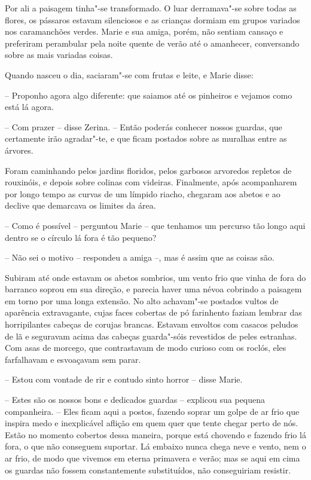 Por ali a paisagem tinha"-se transformado. O luar derramava"-se sobre
todas as flores, os pássaros estavam silenciosos e as crianças dormiam
em grupos variados nos caramanchões verdes. Marie e sua amiga, porém,
não sentiam cansaço e preferiram perambular pela noite quente  de verão
até o amanhecer, conversando sobre as mais variadas coisas. 

Quando nasceu o dia, saciaram"-se com frutas e leite, e Marie disse:

-- Proponho agora algo diferente: que saiamos até os pinheiros e
vejamos como está lá agora.

-- Com prazer -- disse Zerina. -- Então poderás conhecer nossos
guardas, que certamente irão agradar"-te, e que ficam postados sobre as
muralhas entre as árvores.

Foram caminhando pelos jardins floridos, pelos garbosos arvoredos repletos
de rouxinóis, e depois sobre colinas com videiras. Finalmente, após
acompanharem por longo tempo as curvas de um límpido riacho, chegaram
aos abetos e ao declive que demarcava os limites da área.

-- Como é possível -- perguntou Marie -- que tenhamos um percurso tão
longo aqui dentro se o círculo lá fora é tão pequeno?

-- Não sei o motivo -- respondeu a amiga --, mas é assim que as coisas são.

Subiram até onde estavam os abetos sombrios, um vento frio que vinha de
fora do barranco soprou em sua direção, e parecia haver uma névoa
cobrindo a paisagem em torno por uma longa extensão. No alto achavam"-se
postados vultos de aparência extravagante, cujas faces cobertas de pó
farinhento faziam lembrar das horripilantes cabeças de corujas brancas.
Estavam envoltos com casacos peludos de lã e seguravam acima das
cabeças guarda"-sóis revestidos de peles estranhas. Com asas de morcego,
que contrastavam de modo curioso com os roclós, eles farfalhavam e
esvoaçavam sem parar.

-- Estou com vontade de rir e contudo sinto horror -- disse Marie.

-- Estes são os nossos bons e dedicados guardas -- explicou sua
pequena companheira. -- Eles ficam aqui a postos, fazendo soprar um golpe
de ar frio que inspira medo e inexplicável aflição em quem quer que tente
chegar perto de nós. Estão no momento cobertos dessa maneira, porque
está chovendo e fazendo frio lá fora, o que não conseguem suportar. Lá
embaixo nunca chega neve e vento, nem o ar frio, de modo que vivemos em
eterna primavera e verão; mas se aqui em cima os guardas não fossem
constantemente substituídos, não conseguiriam resistir.

